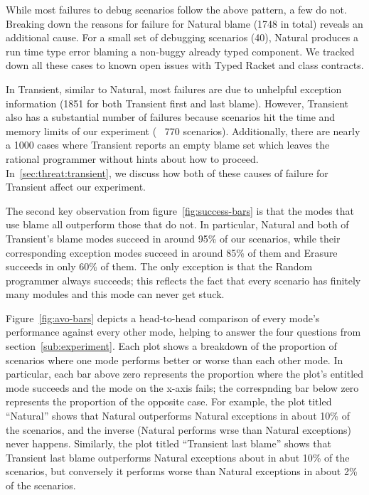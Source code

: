 While most failures to debug scenarios follow the above pattern, a few do not.
Breaking down the reasons for failure for Natural blame (1748 in total)
reveals an additional cause. For a small set of
debugging scenarios (40), Natural produces a run time type error
blaming a non-buggy already typed
component. We tracked down all these cases to known open issues with Typed
Racket and class contracts. 

In Transient, similar to Natural,
most failures are due to unhelpful exception information (1851 for both
Transient first and last blame).  
However, Transient also has a substantial
number of failures because scenarios hit the time and memory
limits of our experiment (~ 770 scenarios).  Additionally, there are nearly a 1000 cases where
Transient reports an empty blame set which leaves the rational programmer
without hints about how to proceed.
In~\ref{sec:threat:transient}, we discuss how both of these causes of
failure for Transient affect our experiment. 

The second key observation from figure~\ref{fig:success-bars} is that the modes that use blame all outperform those that do not.
In particular, Natural and both of Transient's blame modes succeed in around 95\% of our scenarios, while their corresponding exception modes succeed in around 85\% of them and Erasure succeeds in only 60\% of them.
The only exception is that the Random programmer always succeeds;
this reflects the fact that every scenario has finitely many modules and this mode can never get stuck.


Figure~\ref{fig:avo-bars} depicts a head-to-head comparison of every mode's performance against every other mode, helping to answer the four questions from section~\ref{sub:experiment}.
Each plot shows a breakdown of the proportion of scenarios where one mode performs better or worse than each other mode.
In particular, each bar above zero represents the proportion where the plot's entitled mode succeeds and the mode on the x-axis fails; the correspnding bar below zero represents the proportion of the opposite case.
For example, the plot titled ``Natural'' shows that Natural outperforms Natural exceptions in about 10\% of the scenarios, and the inverse (Natural performs wrse than Natural exceptions) never happens.
Similarly, the plot titled ``Transient last blame'' shows that Transient last blame outperforms Natural exceptions about in abut 10\% of the scenarios, but conversely it performs worse than Natural exceptions in about 2\% of the scenarios.

